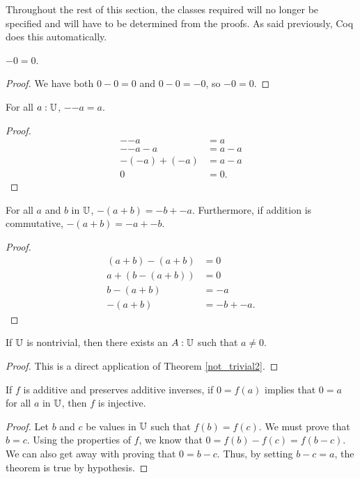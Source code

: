 \documentclass[../math.tex]{subfiles}
\begin{document}
Throughout the rest of this section, the classes required will no longer be
specified and will have to be determined from the proofs.  As said previously,
Coq does this automatically.

\begin{theorem}
    $-0 = 0$.
\end{theorem}
\begin{proof}
    We have both $0 - 0 = 0$ and $0 - 0 = -0$, so $-0 = 0$.
\end{proof}

\begin{theorem}
    For all $a : \mathbb{U}$, $-{-a} = a$.
\end{theorem}
\begin{proof}
    \begin{align*}
        -{-a} &= a \\
        -{-a} - a &= a - a \\
        -(-a) + (-a) &= a - a \\
        0 &= 0.
    \end{align*}
\end{proof}

\begin{theorem} \label{neg_plus}
    For all $a$ and $b$ in $\mathbb{U}$, $-(a + b) = -b + -a$.  Furthermore, if addition
    is commutative, $-(a + b) = -a + -b$.
\end{theorem}
\begin{proof}
    \begin{align*}
        (a + b) - (a + b) &= 0 \\
        a + (b - (a + b)) &= 0 \\
        b - (a + b) &= -a \\
        -(a + b) &= -b + -a.
    \end{align*}
\end{proof}

\begin{theorem} \label{not_trivial_zero}
    If $\mathbb{U}$ is nontrivial, then there exists an $A : \mathbb{U}$ such that $a \neq 0$.
\end{theorem}
\begin{proof}
    This is a direct application of Theorem \ref{not_trivial2}.
\end{proof}

\begin{theorem} \label{homo_zero_inj}
    If $f$ is additive and preserves additive inverses, if $0 = f(a)$ implies
    that $0 = a$ for all $a$ in $\mathbb{U}$, then $f$ is injective.
\end{theorem}
\begin{proof}
    Let $b$ and $c$ be values in $\mathbb{U}$ such that $f(b) = f(c)$.  We must prove
    that $b = c$.  Using the properties of $f$, we know that $0 = f(b) - f(c) =
    f(b - c)$.  We can also get away with proving that $0 = b - c$.  Thus, by
    setting $b - c = a$, the theorem is true by hypothesis.
\end{proof}
\end{document}
